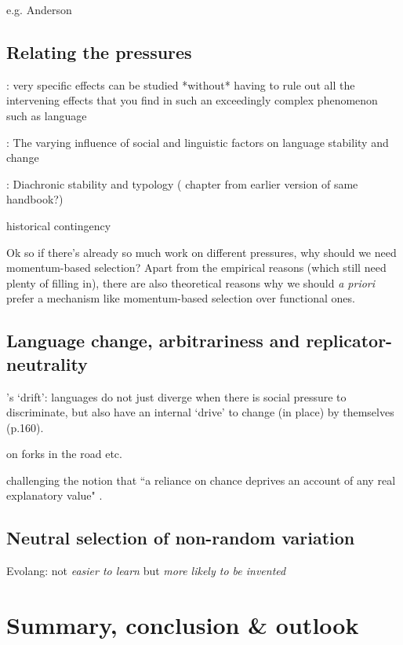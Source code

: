e.g. Anderson

\subsection{Relating the pressures}

\citet{Bickel2015}: very specific effects can be studied *without* having to rule out all the intervening effects that you find in such an exceedingly complex phenomenon such as language


\citet{Sundgren2009}: The varying influence of social and linguistic factors on language stability and change

\citet{Wichmann2015}: Diachronic stability and typology (\citet{Nichols2003} chapter from earlier version of same handbook?)

historical contingency~\citep[p.503]{Labov2001} %

Ok so if there's already so much work on different pressures, why should we need momentum-based selection? Apart from the empirical reasons (which still need plenty of filling in), there are also theoretical reasons why we should \emph{a priori} prefer a mechanism like momentum-based selection over functional ones.

\subsection{Language change, arbitrariness and replicator-neutrality}

\citet{Sapir1921}'s `drift': languages do not just diverge when there is social pressure to discriminate, but also have an internal `drive' to change (in place) by themselves (p.160).

\citep[ch.7-12]{Labov2010} on forks in the road etc.

challenging the notion that ``a reliance on chance deprives an account of any real explanatory value" \citep[p.44]{Joseph2013}.

\subsection{Neutral selection of non-random variation}

Evolang: not \emph{easier to learn} but \emph{more likely to be invented}





\section{Summary, conclusion \& outlook}

